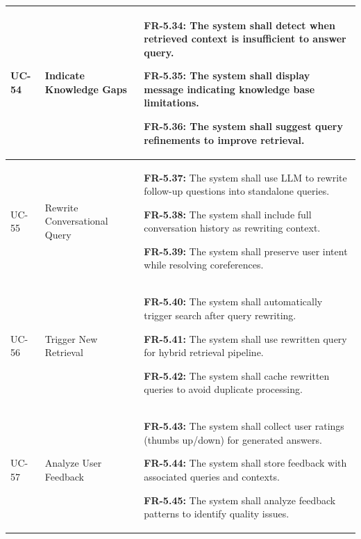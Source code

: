 \begin{longtable}{|>{\raggedright\arraybackslash}p{}|>{\raggedright\arraybackslash}p{}|>{\raggedright\arraybackslash}p{}|}
UC-54 & Indicate Knowledge Gaps &
\begin{frequirements}
\item \textbf{FR-5.34:} The system shall detect when retrieved context is insufficient to answer query.
\item \textbf{FR-5.35:} The system shall display message indicating knowledge base limitations.
\item \textbf{FR-5.36:} The system shall suggest query refinements to improve retrieval.
\end{frequirements} \\
\hline

UC-55 & Rewrite Conversational Query &
\begin{frequirements}
\item \textbf{FR-5.37:} The system shall use LLM to rewrite follow-up questions into standalone queries.
\item \textbf{FR-5.38:} The system shall include full conversation history as rewriting context.
\item \textbf{FR-5.39:} The system shall preserve user intent while resolving coreferences.
\end{frequirements} \\
\hline

UC-56 & Trigger New Retrieval &
\begin{frequirements}
\item \textbf{FR-5.40:} The system shall automatically trigger search after query rewriting.
\item \textbf{FR-5.41:} The system shall use rewritten query for hybrid retrieval pipeline.
\item \textbf{FR-5.42:} The system shall cache rewritten queries to avoid duplicate processing.
\end{frequirements} \\
\hline

UC-57 & Analyze User Feedback &
\begin{frequirements}
\item \textbf{FR-5.43:} The system shall collect user ratings (thumbs up/down) for generated answers.
\item \textbf{FR-5.44:} The system shall store feedback with associated queries and contexts.
\item \textbf{FR-5.45:} The system shall analyze feedback patterns to identify quality issues.
\end{frequirements} \\
\hline


\end{longtable}
